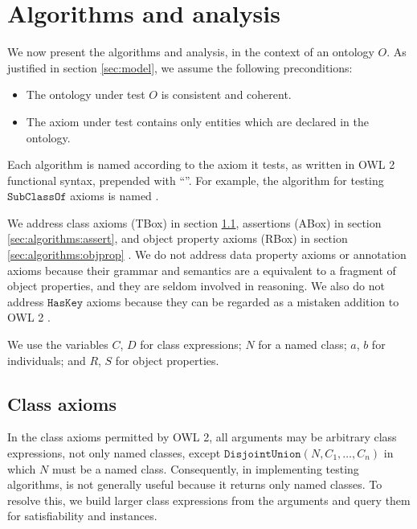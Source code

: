 \documentclass[paper.tex]{subfiles}
\begin{document}
\section{Algorithms and analysis}
\label{sec:algorithms}

We now present the algorithms and analysis, in the context of an ontology $O$.  As justified in section \ref{sec:model}, we assume the following preconditions:
\begin{itemize}[nosep]
  \item The ontology under test $O$ is consistent and coherent.
  \item The axiom under test contains only entities which are declared in the ontology.
\end{itemize}

Each algorithm is named according to the axiom it tests, as written in OWL 2 functional syntax, prepended with ``''.  For example, the algorithm for testing $\mathtt{SubClassOf}$ axioms is named .

We address class axioms (TBox) in section \ref{sec:algorithms:class}, assertions (ABox) in section \ref{sec:algorithms:assert}, and object property axioms (RBox) in section \ref{sec:algorithms:objprop} \todo[TBC].
We do not address data property axioms or annotation axioms because their grammar and semantics are a equivalent to a fragment of object properties, and they are seldom involved in reasoning.
We also do not address $\mathtt{HasKey}$ axioms because they can be regarded as a mistaken addition to OWL 2 \cite{Keet:Personal}.

We use the variables $C$, $D$ for class expressions; $N$ for a named class; $a$, $b$ for individuals; and $R$, $S$ for object properties.

\subsection{Class axioms}
\label{sec:algorithms:class}


In the class axioms permitted by OWL 2, all arguments may be arbitrary class expressions, not only named classes, except $\mathtt{DisjointUnion}(N, C_1, \ldots, C_n)$ in which $N$ must be a named class.  Consequently, in implementing testing algorithms,  is not generally useful because it returns only named classes.  To resolve this, we build larger class expressions from the arguments and query them for satisfiability and instances.
\end{document}
